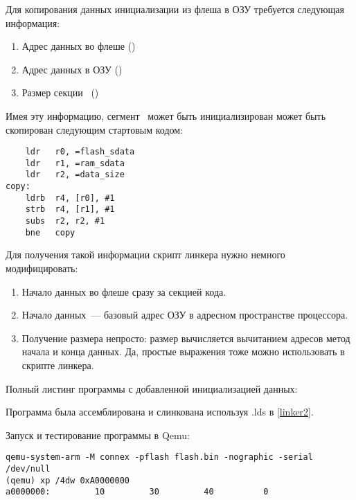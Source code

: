 
Для копирования данных инициализации из флеша в ОЗУ требуется следующая 
информация: 

\begin{enumerate}[nosep]
  \item 
  Адрес данных во флеше ()
  \item 
  Адрес данных в ОЗУ ()
  \item 
  Размер секции \ ()
\end{enumerate}

Имея эту информацию, сегмент \ может быть инициализирован
может быть скопирован следующим стартовым кодом:

\begin{verbatim}
	ldr   r0, =flash_sdata
	ldr   r1, =ram_sdata
	ldr   r2, =data_size
copy:	
	ldrb  r4, [r0], #1
	strb  r4, [r1], #1
	subs  r2, r2, #1
	bne   copy
\end{verbatim}

Для получения такой информации скрипт линкера нужно немного модифицировать:


\begin{enumerate}
  \item 
Начало данных во флеше сразу за секцией кода.
  \item 
Начало данных\ --- базовый адрес ОЗУ в адресном пространстве процессора.
  \item 
Получение размера непросто: размер вычисляется вычитанием адресов
метод начала и конца данных. Да, простые выражения тоже можно использовать в
скрипте линкера.
\end{enumerate}

Полный листинг программы с добавленной инициализацией данных:



Программа была ассемблирована и слинкована используя .lds в \ref{linker2}.

Запуск и тестирование программы в Qemu:

\begin{verbatim}
qemu-system-arm -M connex -pflash flash.bin -nographic -serial /dev/null
(qemu) xp /4dw 0xA0000000
a0000000:         10         30         40          0
\end{verbatim}

